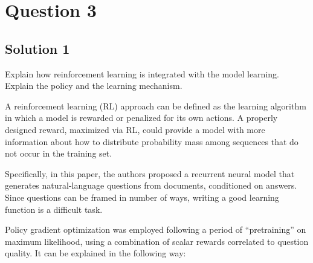 \documentclass[12pt,leqno,a4paper]{article}
\begin{document}
\section{Question 3}

\subsection{Solution 1}
Explain how reinforcement learning is integrated with the model learning.
Explain the policy and the learning mechanism.
\newline


A reinforcement learning (RL) approach can be defined as the learning algorithm in which a model is rewarded or penalized for its own actions. A properly designed reward, maximized via RL, could provide a model with more information about how to distribute probability mass among sequences that do not occur in the training set. 

Specifically, in this paper, the authors proposed a recurrent neural model that generates natural-language questions from documents, conditioned on answers. Since questions can be framed in number of ways, writing a good learning function is a difficult task. 

Policy gradient optimization was employed following a period of “pretraining” on maximum likelihood, using a combination of scalar rewards correlated to question quality. It can be explained in the following way:
\end{document}

